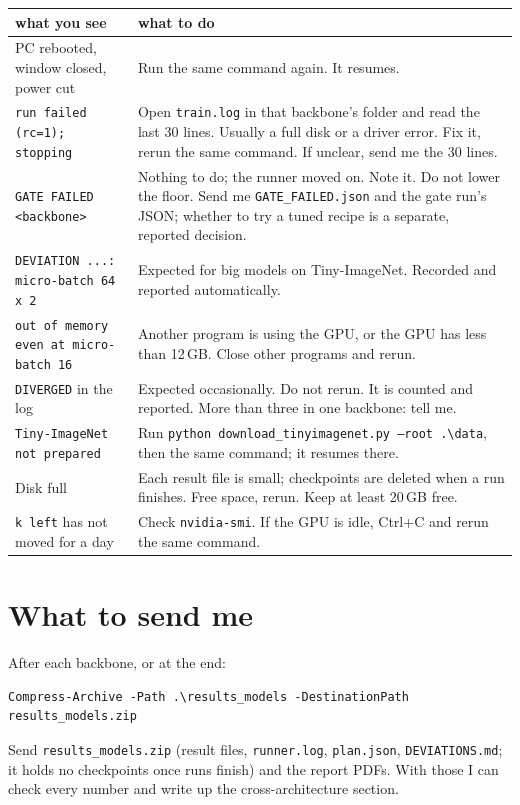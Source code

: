 \documentclass[10.5pt,a4paper]{article}
\newcommand{\cmd}[1]{\texttt{#1}}
\begin{document}
\renewcommand{\arraystretch}{1.25}
\begin{center}\small
\begin{tabularx}{\textwidth}{>{\raggedright\arraybackslash}p{4.1cm} X}
\toprule
what you see & what to do \\
\midrule
PC rebooted, window closed, power cut & Run the same command again. It resumes. \\
\cmd{run failed (rc=1); stopping} & Open \cmd{train.log} in that backbone's folder and read the last 30 lines. Usually a full disk or a driver error. Fix it, rerun the same command. If unclear, send me the 30 lines. \\
\cmd{GATE FAILED <backbone>} & Nothing to do; the runner moved on. Note it. Do not lower the floor. Send me \cmd{GATE\_FAILED.json} and the gate run's JSON; whether to try a tuned recipe is a separate, reported decision. \\
\cmd{DEVIATION ...: micro-batch 64 x 2} & Expected for big models on Tiny-ImageNet. Recorded and reported automatically. \\
\cmd{out of memory even at micro-batch 16} & Another program is using the GPU, or the GPU has less than 12\,GB. Close other programs and rerun. \\
\cmd{DIVERGED} in the log & Expected occasionally. Do not rerun. It is counted and reported. More than three in one backbone: tell me. \\
\cmd{Tiny-ImageNet not prepared} & Run \cmd{python download\_tinyimagenet.py --root .\textbackslash data}, then the same command; it resumes there. \\
Disk full & Each result file is small; checkpoints are deleted when a run finishes. Free space, rerun. Keep at least 20\,GB free. \\
\cmd{k left} has not moved for a day & Check \cmd{nvidia-smi}. If the GPU is idle, Ctrl+C and rerun the same command. \\
\bottomrule
\end{tabularx}
\end{center}

\section{What to send me}\label{sec:send}

After each backbone, or at the end:
\begin{lstlisting}
Compress-Archive -Path .\results_models -DestinationPath results_models.zip
\end{lstlisting}
Send \cmd{results\_models.zip} (result files, \cmd{runner.log}, \cmd{plan.json}, \cmd{DEVIATIONS.md}; it holds no checkpoints once runs finish) and the report PDFs. With those I can check every number and write up the cross-architecture section.
\end{document}
